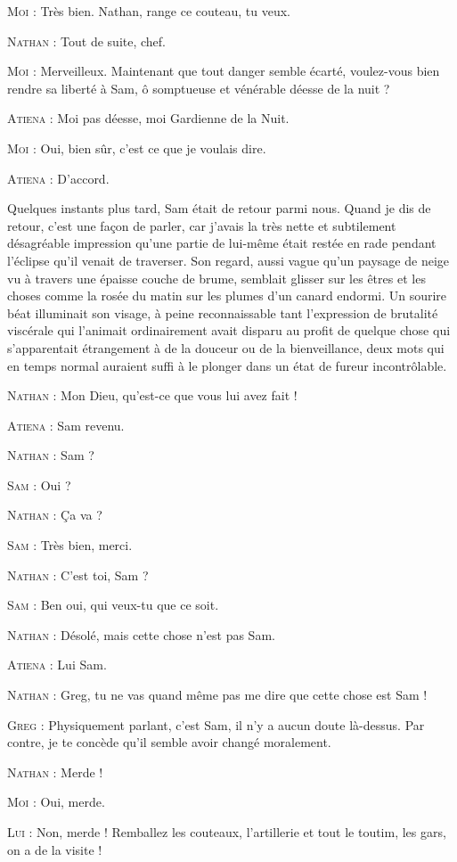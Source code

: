 \begin{dialogue}

\textsc{Moi} : Très bien. Nathan, range ce couteau, tu veux.

\textsc{Nathan} : Tout de suite, chef.

\textsc{Moi} : Merveilleux. Maintenant que tout danger semble écarté, voulez-vous bien rendre sa liberté à Sam, ô somptueuse et vénérable déesse de la nuit ?

\textsc{Atiena} : Moi pas déesse, moi Gardienne de la Nuit.

\textsc{Moi} : Oui, bien sûr, c’est ce que je voulais dire.

\textsc{Atiena} : D’accord.

\end{dialogue}

Quelques instants plus tard, Sam était de retour parmi nous. Quand je dis de retour, c’est une façon de parler, car j’avais la très nette et subtilement désagréable impression qu’une partie de lui-même était restée en rade pendant l’éclipse qu’il venait de traverser. Son regard, aussi vague qu’un paysage de neige vu à travers une épaisse couche de brume, semblait glisser sur les êtres et les choses comme la rosée du matin sur les plumes d’un canard endormi. Un sourire béat illuminait son visage, à peine reconnaissable tant l’expression de brutalité viscérale qui l’animait ordinairement avait disparu au profit de quelque chose qui s’apparentait étrangement à de la douceur ou de la bienveillance, deux mots qui en temps normal auraient suffi à le plonger dans un état de fureur incontrôlable.

\begin{dialogue}

\textsc{Nathan} : Mon Dieu, qu’est-ce que vous lui avez fait !

\textsc{Atiena} : Sam revenu.

\textsc{Nathan} : Sam ?

\textsc{Sam} : Oui ?

\textsc{Nathan} : Ça va ?

\textsc{Sam} : Très bien, merci.

\textsc{Nathan} : C’est toi, Sam ?

\textsc{Sam} : Ben oui, qui veux-tu que ce soit.

\textsc{Nathan} : Désolé, mais cette chose n’est pas Sam.

\textsc{Atiena} : Lui Sam.

\textsc{Nathan} : Greg, tu ne vas quand même pas me dire que cette chose est Sam !

\textsc{Greg} : Physiquement parlant, c’est Sam, il n’y a aucun doute là-dessus. Par contre, je te concède qu’il semble avoir changé moralement.

\textsc{Nathan} : Merde !

\textsc{Moi} : Oui, merde.

\textsc{Lui} : Non, merde ! Remballez les couteaux, l’artillerie et tout le toutim, les gars, on a de la visite !

\end{dialogue}

